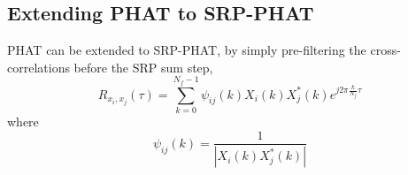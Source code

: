 \subsection{Extending PHAT to SRP-PHAT}
PHAT can be extended to SRP-PHAT, by simply pre-filtering the cross-correlations before the SRP sum step,
\begin{equation}
    R_{x_i,x_j}(\tau)= \sum\limits_{k=0}^{N_{f}-1}{\psi_{ij}(k) X_{i}(k)X_{j}^*(k)e^{j2\pi\frac{k}{N_{f}}\tau}}
\end{equation}
where
\begin{equation}
    \psi_{ij}(k) = \frac{1}{|{X_{i}(k)X_{j}^*(k)}|}
\end{equation}
